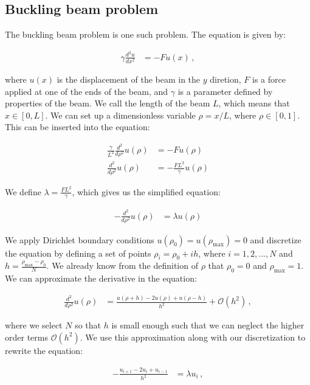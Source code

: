 \documentclass[reprint,english,notitlepage]{revtex4-1}  %
\begin{document}
\subsection{Buckling beam problem} \label{sec:II:c}

The buckling beam problem is one such problem. The equation is given by:

\begin{align*}
\gamma \frac{d^2 u }{dx^2} &= -Fu(x) \, ,
\end{align*}

where $u(x)$ is the displacement of the beam in the $y$ diretion, $F$ is a force applied at one of the ends of the beam, and $\gamma$ is a parameter defined by properties of the beam. We call the length of the beam $L$, which means that $x\in [0,L]$. We can set up a dimensionless variable $\rho = x/L$, where $\rho \in [0,1]$. This can be inserted into the equation:

\begin{align*}
\frac{\gamma}{L^2} \frac{d^2  }{d\rho^2} u(\rho) &= -Fu(\rho) \\
\frac{d^2}{d\rho^2} u(\rho) &= -\frac{FL^2}{\gamma} u(\rho)
\end{align*}

We define $\lambda = \frac{FL^2}{\gamma}$, which gives us the simplified equation:

\begin{align*}
- \frac{d^2}{d\rho^2} u(\rho) &= \lambda u (\rho)
\end{align*}

We apply Dirichlet boundary conditions $u(\rho_0) = u(\rho_\text{max}) = 0$ and discretize the equation by defining a set of points $\rho_i = \rho_0 + ih$, where $i = 1,2,...,N$ and $h = \frac{\rho_\text{max} - \rho_0}{N}$. We already know from the definition of $\rho$ that $\rho_0 = 0$ and $\rho_\text{max} = 1$. We can approximate the derivative in the equation:

\begin{align*}
\frac{d^2}{d\rho^2} u(\rho) &=  \frac{u(\rho+h) - 2u (\rho)  + u(\rho - h) }{h^2} + \mathcal{O}(h^2)  \, ,
\end{align*}

where we select $N$ so that $h$ is small enough such that we can neglect the higher order terms $\mathcal{O}(h^2)$. We use this approximation along with our discretization to rewrite the equation:

\begin{align*}
-\frac{u_{i+1} - 2u_i + u_{i-1}}{h^2} &= \lambda u_i \, ,
\end{align*}
\end{document}
